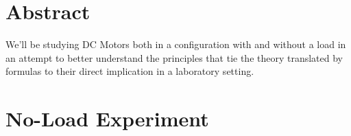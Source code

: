 \documentclass[11pt, openright]{book}
\begin{document}





\vspace*{\fill}

\section{Abstract}

We'll be studying DC Motors both in a configuration with and without a load in an attempt to better understand the principles that tie the theory translated by formulas to their direct implication in a laboratory setting. 

\newpage

\section{No-Load Experiment}
\end{document}
